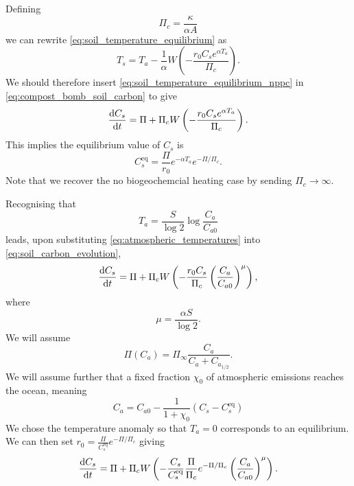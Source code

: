 Defining
\begin{equation}
  \label{eq:critical_npp}
  \Pi_c = \frac{\kappa}{\alpha A}
\end{equation}
we can rewrite \cref{eq:soil_temperature_equilibrium} as
\begin{equation}
  \label{eq:soil_temperature_equilibrium_nppc}
  T_s = T_a - \frac{1}{\alpha} W\left(-\frac{r_0C_s e^{\alpha T_a}}{\Pi_c} \right).
\end{equation}
We should therefore insert \cref{eq:soil_temperature_equilibrium_nppc} in \cref{eq:compost_bomb_soil_carbon}
to give
\begin{equation}
  \label{eq:soil_carbon_evolution}
  \dv{C_s}{t} = \Pi + \Pi_c W\left(-\frac{r_0C_s e^{\alpha T_a}}{\Pi_c} \right).
\end{equation}
This implies the equilibrium value of $C_s$ is
\begin{equation}
  \label{eq:equilibirum_soil_carbon}
  C_s^{\mathrm{eq}} = \frac{\Pi}{r_0} e^{-\alpha T_a} e^{-\Pi/\Pi_c}.
\end{equation}
Note that we recover the no biogeochemcial heating case by sending $\Pi_c \rightarrow \infty$.


Recognising that
\begin{equation}
  \label{eq:atmospheric_temperatures}
  T_a = \frac{S}{\log 2} \log \frac{C_a}{C_{a0}} 
\end{equation}
leads, upon substituting \cref{eq:atmospheric_temperatures} into \cref{eq:soil_carbon_evolution},
\begin{equation}
  \label{eq:global_soil_carbon}
  \dv{C_s}{t} = \Pi + \Pi_c W\left(-\frac{r_0C_s}{\Pi_c} \left(\frac{C_a}{C_{a0}}\right)^\mu \right),
\end{equation}
where
\begin{equation}
  \label{eq:mu}
  \mu = \frac{\alpha S}{\log 2}.
\end{equation}
We will assume
\begin{equation}
  \label{eq:npp_fertilization}
  \Pi(C_a) = \Pi_{\infty}\frac{C_a}{C_a + C_{a_{1/2}}}.
\end{equation}
We will assume further that a fixed fraction $\chi_0$ of atmospheric emissions reaches the ocean, meaning
\begin{equation}
  \label{eq:simple_ocean}
  C_a = C_{a0} -\frac{1}{1+\chi_0} (C_s - C_{s}^{\mathrm{eq}})
\end{equation}
We chose the temperature anomaly so that $T_a = 0$ corresponds to an equilibrium. We can then set
$r_0 = \frac{\Pi}{C_s^{\mathrm{eq}}}e^{-\Pi/\Pi_c}$ giving
\begin{equation}
  \label{eq:soil_carbon_evolution_with_r0_fixed}
  \dv{C_s}{t} = \Pi + \Pi_c W\left(-\frac{C_s}{C_s^{\mathrm{eq}}}\frac{\Pi}{\Pi_c}e^{-\Pi/\Pi_c} \left(\frac{C_a}{C_{a0}}\right)^\mu \right).
\end{equation}

